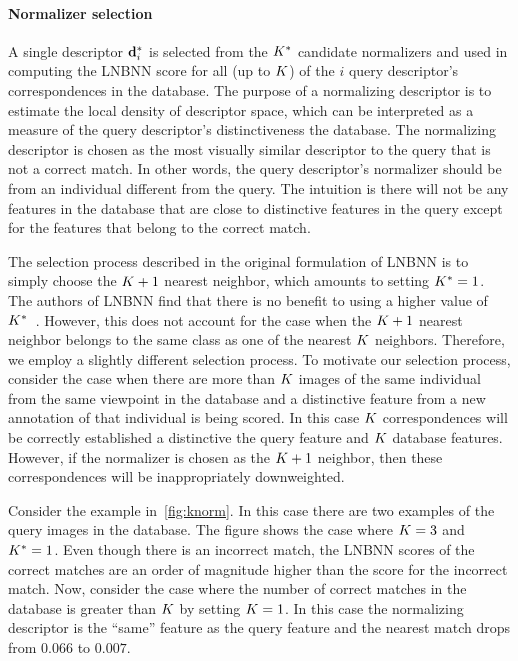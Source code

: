         \paragraph{Normalizer selection}
            A single descriptor $\mathbf{d}^{*}_{i}$ is selected from the $K^{*}{}$ candidate normalizers and used in
              computing the LNBNN score for all (up to $K$) of the $i$\th{} query descriptor's correspondences in
              the database.
            The purpose of a normalizing descriptor is to estimate the local density of descriptor space, which
              can be interpreted as a measure of the query descriptor's distinctiveness \wrt{} the database.
            The normalizing descriptor is chosen as the most visually similar descriptor to the query that is not
              a correct match.
            In other words, the query descriptor's normalizer should be from an individual different from the
              query.
            The intuition is there will not be any features in the database that are close to distinctive
              features in the query except for the features that belong to the correct match.

            The selection process described in the original formulation of LNBNN is to simply choose the $K +
              1$\th{} nearest neighbor, which amounts to setting $K^{*}=1$.
            The authors of LNBNN find that there is no benefit to using a higher value of
              $K^{*}$~\cite{mccann_local_2012}.
            However, this does not account for the case when the $K + 1$\th{} nearest neighbor belongs to the
              same class as one of the nearest $K$ neighbors.
            Therefore, we employ a slightly different selection process.
            To motivate our selection process, consider the case when there are more than $K$ images of the same
              individual from the same viewpoint in the database and a distinctive feature from a new annotation of
              that individual is being scored.
            In this case $K$ correspondences will be correctly established a distinctive the query feature and
              $K$ database features.
            However, if the normalizer is chosen as the $K + 1$ neighbor, then these correspondences will be
              inappropriately downweighted.
              
            Consider the example in~\cref{fig:knorm}.
            In this case there are two examples  of the query images in the database.
            The figure shows the case where $K=3$ and $K^{*}=1$.
            Even though there is an incorrect match, the LNBNN scores of the correct matches are an order of
              magnitude higher than the score for the incorrect match.
            Now, consider the case where the number of correct matches in the database is greater than $K$ by
              setting $K=1$.
            In this case the normalizing descriptor is the ``same'' feature as the query feature and the nearest
              match drops from $0.066$ to $0.007$.

